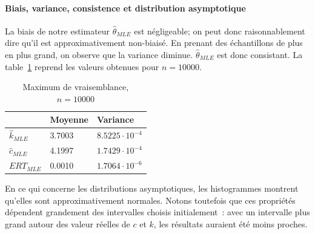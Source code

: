 \paragraph{Biais, variance, consistence et distribution asymptotique}
La biais de notre estimateur $\hat{\theta}_{MLE}$ est négligeable; on peut donc raisonnablement dire qu'il est approximativement non-biaisé. En prenant des échantillons de plus en plus grand, on observe que la variance diminue. $\hat{\theta}_{MLE}$ est donc consistant. La table~\ref{table:MLE_n10000} reprend les valeurs obtenues pour $n = 10000$.
\begin{table}[!ht]
\centering
\begin{tabular}{|l|l|l|}
\hline
				& Moyenne 	& Variance\\
\hline
$\hat{k}_{MLE}$ & 3.7003 	& $8.5225 \cdot 10^{-4}$\\
$\hat{c}_{MLE}$ & 4.1997 	& $1.7429 \cdot 10^{-4}$\\
$ERT_{MLE}$		& 0.0010	& $1.7064 \cdot 10^{-6}$
\\
\hline
\end{tabular}
\caption{Maximum de vraisemblance, $n=10000$}
\label{table:MLE_n10000}
\end{table}
En ce qui concerne les distributions asymptotiques, les histogrammes montrent qu'elles sont approximativement normales. Notons toutefois que ces propriétés dépendent grandement des intervalles choisis initialement~: avec un intervalle plus grand autour des valeur réelles de $c$ et $k$, les résultats auraient été moins proches.


